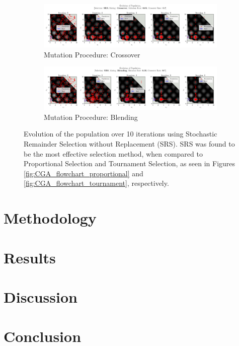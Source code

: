 \documentclass[10pt]{article}
\begin{document}
\begin{figure}[H]
    \centering
    \begin{subfigure}{\textwidth}
        \centering
        \includegraphics[width=\textwidth]{../figures/KBF/10_iters/SRS/Crossover/0.05_0.7_Population.png}
        \caption{Mutation Procedure: Crossover}
        \label{fig:CGA_flowchart_srs_crossover}
    \end{subfigure}
    \begin{subfigure}{\textwidth}
        \centering
        \includegraphics[width=\textwidth]{../figures/KBF/10_iters/SRS/Blending/0.05_0.7_Population.png}
        \caption{Mutation Procedure: Blending}
        \label{fig:CGA_flowchart_srs_blending}
    \end{subfigure}
    \captionsetup{justification=centering}
    \caption{Evolution of the population over 10 iterations using Stochastic Remainder Selection without Replacement (SRS). SRS was found to be the most effective selection method, when compared to Proportional Selection and Tournament Selection, as seen in Figures \ref{fig:CGA_flowchart_proportional} and \ref{fig:CGA_flowchart_tournament}, respectively.}
    \label{fig:CGA_flowchart_srs}
\end{figure}


\section{Methodology}
\section{Results}
\section{Discussion}
\section{Conclusion}

\end{document}
